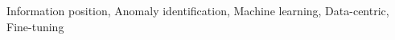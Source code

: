 \documentclass[conference]{IEEEtran}
\begin{document}
\begin{IEEEkeywords}
Information position, Anomaly identification, Machine learning, Data-centric, Fine-tuning
\end{IEEEkeywords}



\balance

\printbibliography

\end{document}
